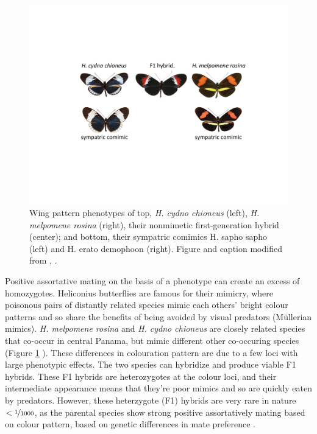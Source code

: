 {{%
\begin{figure}
\begin{center}  
  \includegraphics[width = \textwidth]{Journal_figs/alleles_genotypes/Heliconius_Merrill_assort_mating/labeled_trimmed_Heliconius_Merrill_assort_mating}
\end{center}
\caption{ Wing pattern phenotypes of top, {\it H. cydno chioneus} (left),
  {\it H. melpomene rosina} (right), their nonmimetic first-generation
  hybrid (center); and bottom, their sympatric comimics H. sapho sapho
  (left) and H. erato demophoon (right).  Figure and caption modified from \citet{merrill2019genetic},
  \PLOSccBY. }\label{fig:Heliconius_Merrill_assort}  
\end{figure}
Positive assortative mating on the basis of a phenotype can create an
excess of homozygotes. Heliconius butterflies are famous for their
mimicry, where poisonous pairs of
distantly related species mimic each others' bright colour patterns
and so share the benefits of being avoided by visual predators
(Müllerian mimics). {\it H. melpomene rosina} and {\it H. cydno chioneus} are
closely related species that co-occur in central Panama, but mimic
different other co-occuring species (Figure \ref{fig:Heliconius_Merrill_assort} ). These differences in colouration pattern
are due to a few loci with large phenotypic effects. The two species can hybridize and
produce viable F1 hybrids. These F1 hybrids are heterozygotes at the
colour loci, and their intermediate appearance means that they're poor
mimics and so are quickly eaten by predators. However, these heterzygote
(F1) hybrids are very rare in nature $< \nicefrac{1}{1000}$, as the parental species show
strong positive assortatively mating based on colour pattern, based on
genetic differences in mate preference \citet{merrill2019genetic}. 

}}
